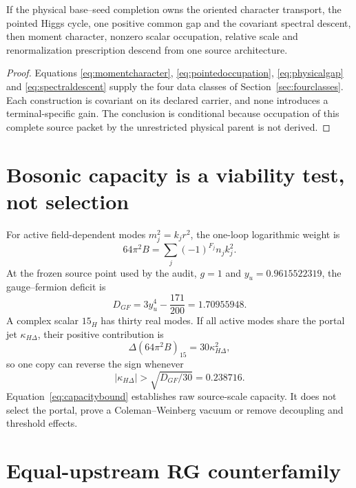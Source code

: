 \begin{theorem}
If the physical base--seed completion owns the oriented character transport,
the pointed Higgs cycle, one positive common gap and the covariant spectral
descent, then moment character, nonzero scalar occupation, relative scale and
renormalization prescription descend from one source architecture.
\end{theorem}
\begin{proof}
Equations \eqref{eq:momentcharacter}, \eqref{eq:pointedoccupation},
\eqref{eq:physicalgap} and \eqref{eq:spectraldescent} supply the four data
classes of Section~\ref{sec:fourclasses}.  Each construction is covariant on
its declared carrier, and none introduces a terminal-specific gain.  The
conclusion is conditional because occupation of this complete source packet
by the unrestricted physical parent is not derived.
\end{proof}

\section{Bosonic capacity is a viability test, not selection}

For active field-dependent modes $m_j^2=k_jr^2$, the one-loop logarithmic
weight is
\begin{equation}
 64\pi^2 B=\sum_j(-1)^{F_j}n_jk_j^2.
\end{equation}
At the frozen source point used by the audit, $g=1$ and
$y_u=0.9615522319$, the gauge--fermion deficit is
\begin{equation}
 D_{GF}=3y_u^4-\frac{171}{200}=1.70955948.
\end{equation}
A complex scalar $15_H$ has thirty real modes.  If all active modes share the
portal jet $\kappa_{H\Delta}$, their positive contribution is
\begin{equation}
 \Delta(64\pi^2B)_{15}=30\kappa_{H\Delta}^2,
\end{equation}
so one copy can reverse the sign whenever
\begin{equation}
 \boxed{|\kappa_{H\Delta}|>\sqrt{D_{GF}/30}=0.238716.}
 \label{eq:capacitybound}
\end{equation}
Equation~\eqref{eq:capacitybound} establishes raw source-scale capacity.  It
does not select the portal, prove a Coleman--Weinberg vacuum or remove
decoupling and threshold effects.

\section{Equal-upstream RG counterfamily}

